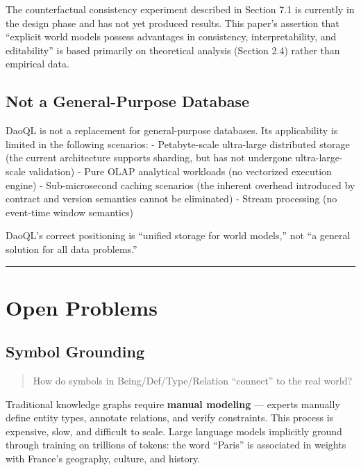 \documentclass[11pt,a4paper]{article}
\begin{document}
The counterfactual consistency experiment described in Section 7.1 is
currently in the design phase and has not yet produced results. This
paper's assertion that ``explicit world models possess advantages in
consistency, interpretability, and editability'' is based primarily on
theoretical analysis (Section 2.4) rather than empirical data.

\subsection{Not a General-Purpose
Database}\label{not-a-general-purpose-database}

DaoQL is not a replacement for general-purpose databases. Its
applicability is limited in the following scenarios: - Petabyte-scale
ultra-large distributed storage (the current architecture supports
sharding, but has not undergone ultra-large-scale validation) - Pure
OLAP analytical workloads (no vectorized execution engine) -
Sub-microsecond caching scenarios (the inherent overhead introduced by
contract and version semantics cannot be eliminated) - Stream processing
(no event-time window semantics)

DaoQL's correct positioning is ``unified storage for world models,'' not
``a general solution for all data problems.''

\begin{center}\rule{0.5\linewidth}{0.5pt}\end{center}

\section{Open Problems}\label{open-problems}

\subsection{Symbol Grounding}\label{symbol-grounding}

\begin{quote}
How do symbols in Being/Def/Type/Relation ``connect'' to the real world?
\end{quote}

Traditional knowledge graphs require \textbf{manual modeling} ---
experts manually define entity types, annotate relations, and verify
constraints. This process is expensive, slow, and difficult to scale.
Large language models implicitly ground through training on trillions of
tokens: the word ``Paris'' is associated in weights with France's
geography, culture, and history.
\end{document}
